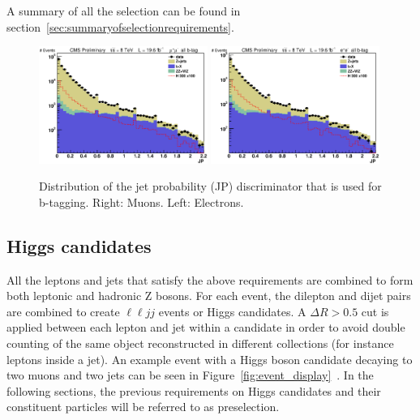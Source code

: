A summary of all the selection can be found in section~\ref{sec:summaryofselectionrequirements}.


\begin{figure}[htb]
\begin{center}
\centerline{
\includegraphics[width=0.49\textwidth]{presentation/defense/images/preselection/mu/j0jp_log.eps}
\includegraphics[width=0.49\textwidth]{presentation/defense/images/preselection/el/j0jp_log.eps}
}
\caption{
Distribution of the jet probability (JP) discriminator that is used for b-tagging.  Right: Muons. Left: Electrons.
}
\label{fig:JP}
\end{center}
\end{figure}


\subsection{Higgs candidates}
\label{sec:reco}
All the leptons and jets that satisfy the above requirements are combined to form both leptonic and hadronic Z bosons.  For each event, the dilepton and dijet pairs are combined to create $\ell \ell jj$ events or Higgs candidates. A $\Delta R > 0.5$ cut is applied between each lepton and jet within a candidate in order to avoid double counting of the same object reconstructed in different collections (for instance leptons inside a jet). An example event with a Higgs boson candidate decaying to two muons and two jets can be seen in Figure~\ref{fig:event_display}~\cite{CMS-PAS-HIG-12-024}. In the following sections, the previous requirements on Higgs candidates and their constituent particles will be referred to as preselection.

